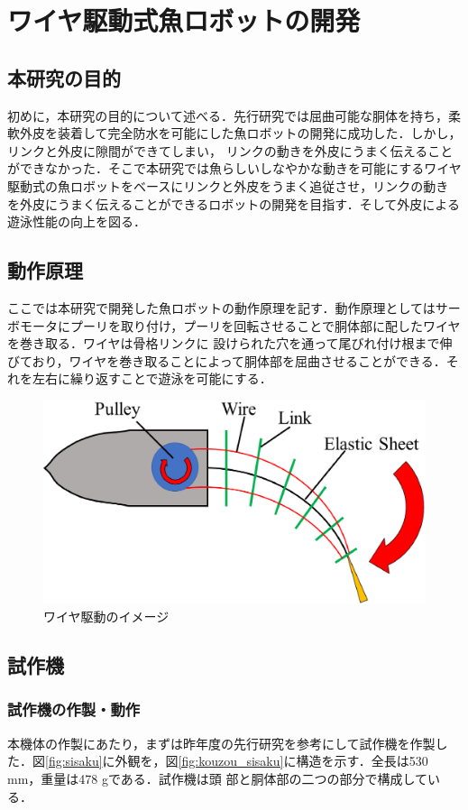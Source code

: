 \newpage
\section{ワイヤ駆動式魚ロボットの開発}
\subsection{本研究の目的}
初めに，本研究の目的について述べる．先行研究では屈曲可能な胴体を持ち，柔軟外皮を装着して完全防水を可能にした魚ロボットの開発に成功した．しかし，リンクと外皮に隙間ができてしまい，
リンクの動きを外皮にうまく伝えることができなかった．そこで本研究では魚らしいしなやかな動きを可能にするワイヤ駆動式の魚ロボットをベースにリンクと外皮をうまく追従させ，リンクの動き
を外皮にうまく伝えることができるロボットの開発を目指す．そして外皮による遊泳性能の向上を図る．

\subsection{動作原理}
ここでは本研究で開発した魚ロボットの動作原理を記す．動作原理としてはサーボモータにプーリを取り付け，プーリを回転させることで胴体部に配したワイヤを巻き取る．ワイヤは骨格リンクに
設けられた穴を通って尾びれ付け根まで伸びており，ワイヤを巻き取ることによって胴体部を屈曲させることができる．それを左右に繰り返すことで遊泳を可能にする．

\begin{figure}[b]
   \centering
   \includegraphics[width=0.6\linewidth]{chapters/picture/waiyakudou.eps}
   \caption{ワイヤ駆動のイメージ}
   \label{fig:waiyakudou}
\end{figure}

\subsection{試作機}
\subsubsection{試作機の作製・動作}
本機体の作製にあたり，まずは昨年度の先行研究を参考にして試作機を作製した．図\ref{fig:sisaku}に外観を，図\ref{fig:kouzou_sisaku}に構造を示す．全長は530 mm，重量は478 gである．試作機は頭
部と胴体部の二つの部分で構成している．

